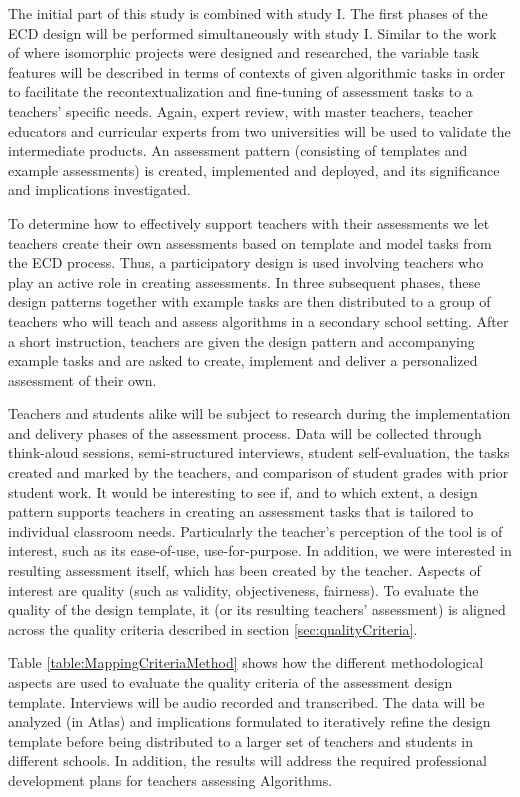 The initial part of this study is combined with study I. The first phases of the ECD design will be performed simultaneously with study I. Similar to the work of  where isomorphic projects were designed and researched, the variable task features will be described in terms of contexts of given algorithmic tasks in order to facilitate the recontextualization and fine-tuning of assessment tasks to a teachers' specific needs. Again, expert review, with master teachers, teacher educators and curricular experts from two universities will be used to validate the intermediate products. An assessment pattern (consisting of templates and example assessments) is created, implemented and deployed, and its significance and implications investigated.


To determine how to effectively support teachers with their assessments we let teachers create their own assessments based on template and model tasks from the ECD process. Thus, a participatory design is used involving teachers who play an active role in creating assessments. In three subsequent phases, these design patterns together with example tasks are then distributed to a group of teachers who will teach and assess algorithms in a secondary school setting. After a short instruction, teachers are given the design pattern and accompanying example tasks and are asked to create, implement and deliver a personalized assessment of their own.


Teachers and students alike will be subject to research during the implementation and delivery phases of the assessment process. Data will be collected through think-aloud sessions, semi-structured interviews, student self-evaluation, the tasks created and marked by the teachers, and comparison of student grades with prior student work. It would be interesting to see if, and to which extent, a design pattern supports teachers in creating an assessment tasks that is tailored to individual classroom needs. Particularly the teacher's perception of the tool is of interest, such as its ease-of-use, use-for-purpose. In addition, we were interested in resulting assessment itself, which has been created by the teacher. Aspects of interest are quality (such as validity, objectiveness, fairness). To evaluate the quality of the design template, it (or its resulting teachers' assessment) is aligned across the quality criteria described in section \ref{sec:qualityCriteria}.




Table \ref{table:MappingCriteriaMethod} shows how the different methodological aspects are used to evaluate the quality criteria of the assessment design template. Interviews will be audio recorded and transcribed. The data will be analyzed (in Atlas) and implications formulated to iteratively refine the design template before being distributed to a larger set of teachers and students in different schools.  In addition, the results will address the required professional development plans for teachers assessing Algorithms.

